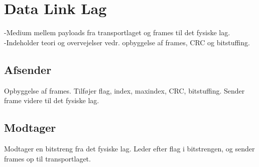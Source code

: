 \section{Data Link Lag}
-Medium mellem payloads fra transportlaget og frames til det fysiske lag. \\
-Indeholder teori og overvejelser vedr. opbyggelse af frames, CRC og bitstuffing.

\subsection{Afsender}
Opbyggelse af frames. Tilføjer flag, index, maxindex, CRC, bitstuffing.  Sender frame videre til det fysiske lag.

\subsection{Modtager}
Modtager en bitstreng fra det fysiske lag. Leder efter flag i bitstrengen, og sender frames op til transportlaget. 
